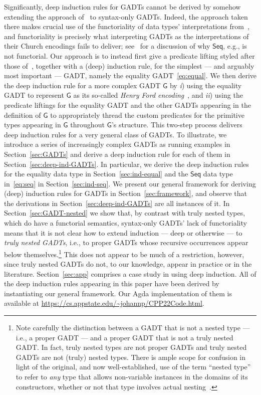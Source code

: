 \documentclass[sigplan,10pt]{acmart}
\begin{document}
Significantly, deep induction rules for GADTs cannot be derived by
somehow extending the approach of~\cite{jp20} to syntax-only
GADTs. Indeed, the approach taken there makes crucial use of the
functoriality of data types' interpretations from~\cite{jp19}, and
functoriality is precisely what interpreting GADTs as the
interpretations of their Church encodings fails to deliver;
see~\cite{jg08} for a discussion of why $\mathsf{Seq}$, e.g., is not
functorial. Our approach is to instead first give a predicate lifting
styled after those of~\cite{jp20}, together with a (deep) induction
rule, for the simplest --- and arguably most important --- GADT,
namely the equality GADT~\eqref{eq:equal}. We then derive the deep
induction rule for a more complex GADT $\mathsf{G}$ by {\em i}) using
the equality GADT to represent $\mathsf{G}$ as its so-called {\em
  Henry Ford encoding}~\cite{ch03,hin03,mcb99,sjsv09,sp04}, and {\em
  ii}) using the predicate liftings for the equality GADT and the
other GADTs appearing in the definition of $\mathsf{G}$ to
appropriately thread the custom predicates for the primitive types
appearing in $\mathsf{G}$ throughout $\mathsf{G}$'s structure. This
two-step process delivers deep induction rules for a very general
class of GADTs. To illustrate, we introduce a series of increasingly
complex GADTs as running examples in Section~\ref{sec:GADTs} and
derive a deep induction rule for each of them in
Section~\ref{sec:deep-ind-GADTs}. In particular, we derive the deep
induction rules for the equality data type in
Section~\ref{sec:ind-equal} and the $\mathsf{Seq}$ data type
in~\eqref{eq:seq} in Section~\ref{sec:ind-seq}. We present our general
framework for deriving (deep) induction rules for GADTs in
Section~\ref{sec:framework}, and observe that the derivations in
Section~\ref{sec:deep-ind-GADTs} are all instances of it.  In
Section~\ref{sec:GADT-nested} we show that, by contrast with truly
nested types, which do have a functorial semantics, syntax-only GADTs'
lack of functoriality means that it is not clear how to extend
induction --- deep or otherwise --- to {\em truly nested GADTs}, i.e.,
to proper GADTs whose recursive occurrences appear below
themselves.\footnote{Note carefully the distinction between a GADT
  that is not a nested type --- i.e., a proper GADT --- and a proper
  GADT that is not a truly nested GADT.  In fact, truly nested types
  are not proper GADTs and truly nested GADTs are not (truly) nested
  types. There is ample scope for confusion in light of the original,
  and now well-established, use of the term ``nested type'' to refer
  to {\em any} type that allows non-variable instances in the domains
  of its constructors, whether or not that type involves actual
  nesting~\cite{bm98}.}  This does not appear to be much of a
restriction, however, since truly nested GADTs do not, to our
knowledge, appear in practice or in the
literature. Section~\ref{sec:app} comprises a case study in using deep
induction. All of the deep induction rules appearing in this paper
have been derived by instantiating our general framework. Our Agda
implementation of them is available at
\url{https://cs.appstate.edu/~johannp/CPP22Code.html}.
\end{document}
